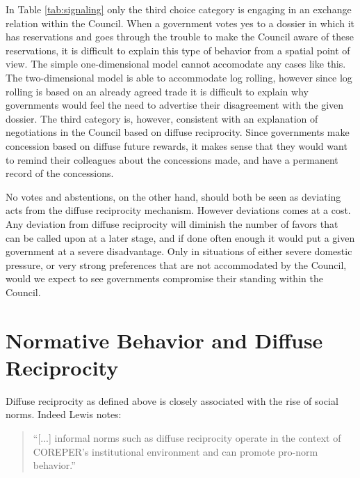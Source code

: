 In Table \ref{tab:signaling} only the third choice category is engaging in an exchange relation within the Council. When a government votes yes to a dossier in which it has reservations and goes through the trouble to make the Council aware of these reservations, it is difficult to explain this type of behavior from a spatial point of view. The simple one-dimensional model cannot accomodate any cases like this. The two-dimensional model is able to accommodate log rolling, however since log rolling is based on an already agreed trade it is difficult to explain why governments would feel the need to advertise their disagreement with the given dossier. The third category is, however, consistent with an explanation of negotiations in the Council based on diffuse reciprocity. Since governments make concession based on diffuse future rewards, it makes sense that they would want to remind their colleagues about the concessions made, and have a permanent record of the concessions. 
 
No votes and abstentions, on the other hand, should both be seen as deviating acts from the diffuse reciprocity mechanism. However deviations comes at a cost. Any deviation from diffuse reciprocity will diminish the number of favors that can be called upon at a later stage, and if done often enough it would put a given government at a severe disadvantage. Only in situations of either severe domestic pressure, or very strong preferences that are not accommodated by the Council, would we expect to see governments compromise their standing within the Council. 


\section{Normative Behavior and Diffuse Reciprocity}

Diffuse reciprocity as defined above is closely associated with the rise of social norms. Indeed Lewis notes:

\begin{quote}
  ``[...] informal norms such as diffuse reciprocity operate in the context of COREPER's institutional environment and can promote pro-norm behavior.''
\end{quote}

